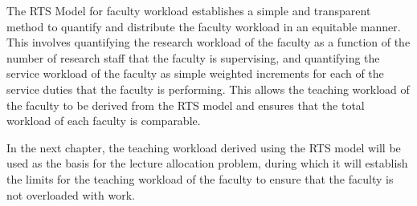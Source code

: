The RTS Model for faculty workload establishes a simple and transparent method to quantify and distribute the faculty workload in an equitable manner. This involves quantifying the research workload of the faculty as a function of the number of research staff that the faculty is supervising, and quantifying the service workload of the faculty as simple weighted increments for each of the service duties that the faculty is performing. This allows the teaching workload of the faculty to be derived from the RTS model and ensures that the total workload of each faculty is comparable.

In the next chapter, the teaching workload derived using the RTS model will be used as the basis for the lecture allocation problem, during which it will establish the limits for the teaching workload of the faculty to ensure that the faculty is not overloaded with work.

